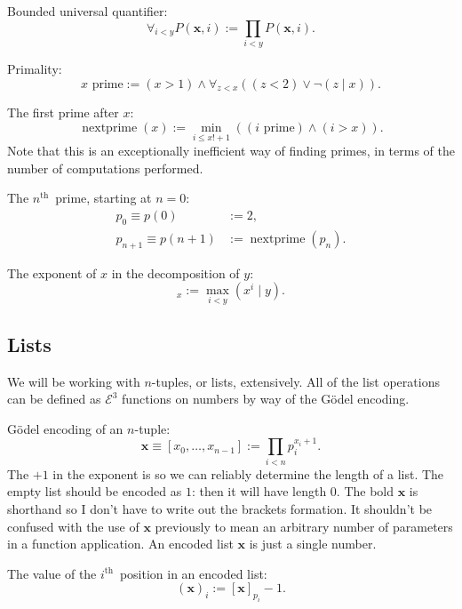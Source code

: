 \documentclass[a4paper]{article}
\newcommand{\grz}[1]{$\mathcal{E}^{#1}$}	%
\newcommand{\nth}{$n^{\textrm{th}}$~}	%
\newcommand{\ith}{$i^{\textrm{th}}$~}
\newcommand{\xvec}{\mathbf{x}}	%
\newcommand{\recur}[1]{\begin{equation} \begin{split} #1 \end{split} \end{equation}}	%
\theoremstyle{plain}
\theoremstyle{definition}
\begin{document}
Bounded universal quantifier:
\begin{equation} \forall_{i < y} P(\xvec,i) := \prod_{i < y} P(\xvec,i). \end{equation}

Primality:
\begin{equation} x \textrm{ prime} :=  (x > 1) \wedge \forall_{z < x} \left( (z < 2) \vee \neg (z \mid x) \right). \end{equation}

The first prime after $x$:
\begin{equation} \operatorname{nextprime}(x) := \min_{i \leq x!+1} \left( (i \textrm{ prime}) \wedge (i > x) \right). \end{equation}
Note that this is an exceptionally inefficient way of finding primes, in terms of the number of computations performed. 

The \nth prime, starting at $n=0$:
\recur{
	p_0 \equiv p(0) &:= 2,		\\
	p_{n+1} \equiv p(n+1) &:= \operatorname{nextprime} (p_n).
}

The exponent of $x$ in the decomposition of $y$:
\begin{equation} [y]_x := \max_{i < y} \left( x^i \mid y \right). \end{equation}

\subsection{Lists}\label{sec:lists}

We will be working with $n$-tuples, or lists, extensively. All of the list operations can be defined as \grz{3} functions on numbers by way of the G\"odel encoding.

G\"odel encoding of an $n$-tuple:
\begin{equation} \xvec \equiv [x_0, \dots, x_{n-1}] := \prod_{i < n} p_i^{x_i+1}. \end{equation}
The $+1$ in the exponent is so we can reliably determine the length of a list.  The empty list should be encoded as $1$: then it will have length $0$.
The bold $\xvec$ is shorthand so I don't have to write out the brackets formation. It shouldn't be confused with the use of $\xvec$ previously to mean an arbitrary number of parameters in a function application. An encoded list $\xvec$ is just a single number.

The value of the \ith position in an encoded list:
\begin{equation} (\xvec)_i := [\xvec]_{p_i} - 1. \end{equation}
\end{document}
